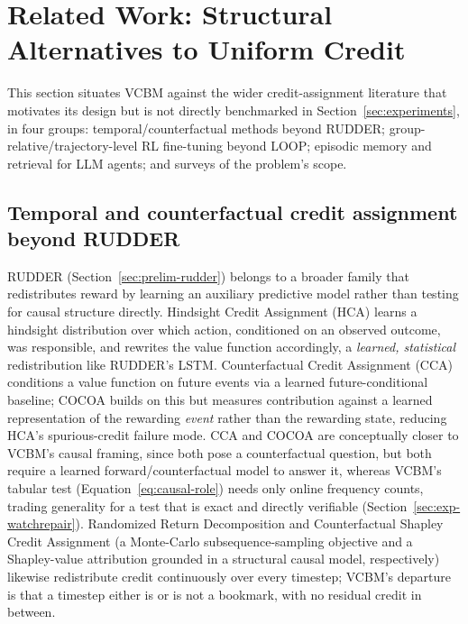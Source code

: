 \documentclass[conference]{IEEEtran}
\begin{document}
\section{Related Work: Structural Alternatives to Uniform Credit}
\label{sec:related-work}

This section situates VCBM against the wider credit-assignment literature that motivates its design but is not directly benchmarked in Section~\ref{sec:experiments}, in four groups: temporal/counterfactual methods beyond RUDDER; group-relative/trajectory-level RL fine-tuning beyond LOOP; episodic memory and retrieval for LLM agents; and surveys of the problem's scope.

\subsection{Temporal and counterfactual credit assignment beyond RUDDER}
\label{sec:rw-temporal}

RUDDER (Section~\ref{sec:prelim-rudder}) belongs to a broader family that redistributes reward by learning an auxiliary predictive model rather than testing for causal structure directly. Hindsight Credit Assignment (HCA) \cite{b_hca2019} learns a hindsight distribution over which action, conditioned on an observed outcome, was responsible, and rewrites the value function accordingly, a \emph{learned, statistical} redistribution like RUDDER's LSTM. Counterfactual Credit Assignment (CCA) \cite{b_cca2021} conditions a value function on future events via a learned future-conditional baseline; COCOA \cite{b_cocoa2023} builds on this but measures contribution against a learned representation of the rewarding \emph{event} rather than the rewarding state, reducing HCA's spurious-credit failure mode. CCA and COCOA are conceptually closer to VCBM's causal framing, since both pose a counterfactual question, but both require a learned forward/counterfactual model to answer it, whereas VCBM's tabular test (Equation~\eqref{eq:causal-role}) needs only online frequency counts, trading generality for a test that is exact and directly verifiable (Section~\ref{sec:exp-watchrepair}). Randomized Return Decomposition \cite{b_randomized_return_decomp2022} and Counterfactual Shapley Credit Assignment \cite{b_phi_ppo2026} (a Monte-Carlo subsequence-sampling objective and a Shapley-value attribution grounded in a structural causal model, respectively) likewise redistribute credit continuously over every timestep; VCBM's departure is that a timestep either is or is not a bookmark, with no residual credit in between.
\end{document}
